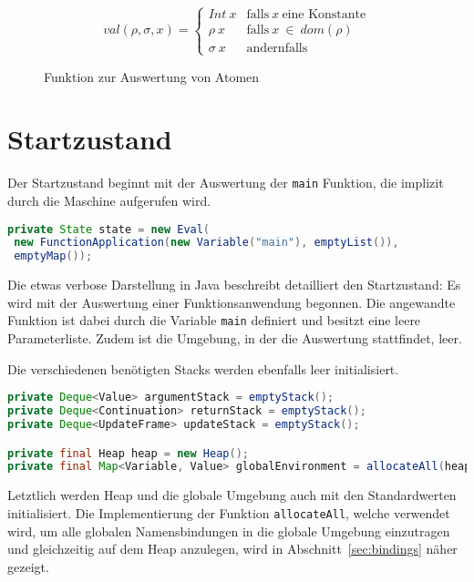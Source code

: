 \begin{figure}[h]
  \centering
  \[
  val(\rho, \sigma, x) =
    \begin{cases}
      Int\ x & \text{falls}\ x\ \text{eine Konstante} \\
      \rho\ x & \text{falls}\ x\ \in\ dom(\rho) \\
      \sigma\ x & \text{andernfalls}
    \end{cases}
  \]
  \caption{Funktion zur Auswertung von Atomen}\label{fig:val}
\end{figure}



\section{Startzustand}

Der Startzustand beginnt mit der Auswertung der \texttt{main} Funktion, die implizit durch die Maschine aufgerufen wird.

\begin{lstlisting}[language=Java]
private State state = new Eval(
 new FunctionApplication(new Variable("main"), emptyList()),
 emptyMap());
\end{lstlisting}

Die etwas verbose Darstellung in Java beschreibt detailliert den Startzustand:
Es wird mit der Auswertung einer Funktionsanwendung begonnen.
Die angewandte Funktion ist dabei durch die Variable \texttt{main} definiert und besitzt eine leere Parameterliste.
Zudem ist die Umgebung, in der die Auswertung stattfindet, leer.

Die verschiedenen benötigten Stacks werden ebenfalls leer initialisiert.

\begin{lstlisting}[language=java]
private Deque<Value> argumentStack = emptyStack();
private Deque<Continuation> returnStack = emptyStack();
private Deque<UpdateFrame> updateStack = emptyStack();

private final Heap heap = new Heap();
private final Map<Variable, Value> globalEnvironment = allocateAll(heap, program.bindings, emptyMap(), true);
\end{lstlisting}

Letztlich werden Heap und die globale Umgebung auch mit den Standardwerten initialisiert.
Die Implementierung der Funktion \texttt{allocateAll}, welche verwendet wird, um alle globalen Namensbindungen in die globale Umgebung einzutragen und gleichzeitig auf dem Heap anzulegen, wird in Abschnitt~\ref{sec:bindings} näher gezeigt.


